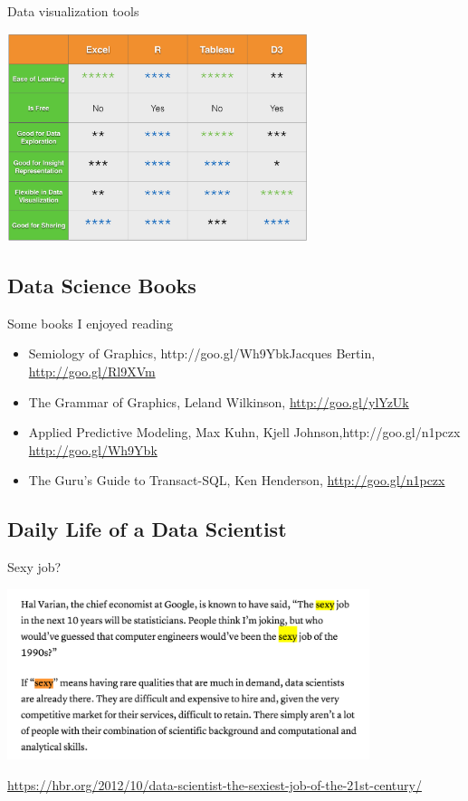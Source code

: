 \documentclass[10pt]{beamer}
\begin{document}
    \begin{frame}{Data visualization tools}
      \begin{center}
         \includegraphics[width=250pt]{graphs/data_visualization_tools}
      \end{center}
    \end{frame}
  
  \subsection{Data Science Books}

    \begin{frame}{Some books I enjoyed reading}
      \begin{itemize}
        \item Semiology of Graphics, http://goo.gl/Wh9YbkJacques Bertin, \url{http://goo.gl/Rl9XVm}
        \item The Grammar of Graphics, Leland Wilkinson, \url{http://goo.gl/ylYzUk}
        \item Applied Predictive Modeling, Max Kuhn, Kjell Johnson,http://goo.gl/n1pczx \url{http://goo.gl/Wh9Ybk}
        \item The Guru's Guide to Transact-SQL, Ken Henderson, \url{http://goo.gl/n1pczx}
      \end{itemize}
    \end{frame}
  
  \subsection{Daily Life of a Data Scientist}

    \begin{frame}{Sexy job?}    
      \begin{center}
         \includegraphics[width=300pt]{graphs/sexy_job}
      \end{center}
      {\footnotesize \url{https://hbr.org/2012/10/data-scientist-the-sexiest-job-of-the-21st-century/}}
    \end{frame}
    
\end{document}
